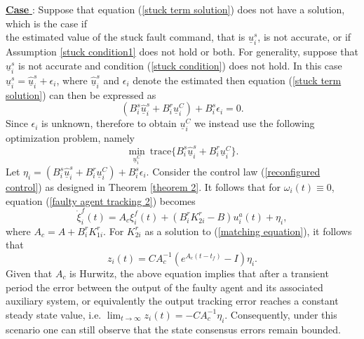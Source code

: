 \documentclass[12pt,draftcls,onecolumn]{IEEEtran}
\newcommand{\RNum}[1]{\uppercase\expandafter{\romannumeral #1\relax}}
\begin{document}
\underline{\textbf{Case \RNum{3}}}: Suppose that equation (\ref{stuck term solution}) does not have a solution, which is the case if \\
the estimated value of the stuck fault command, that is $\underline u_i^s$, is not accurate, or if Assumption  \ref{stuck condition1} does not hold or both. For generality, suppose that  $\underline u_i^s$ is not accurate and condition (\ref{stuck condition}) does not hold.  
In this case $\underline{u}_i^s=\underline{ \hat u}_i^s+\epsilon_i$, where $\underline{ \hat u}_i^s$ and $\epsilon_i$ denote the estimated then equation (\ref{stuck term solution}) can then be expressed as
$$ (B_i^s\underline{ \hat u}_i^s+B_i^r\underline u_i^C)+B_i^s\epsilon_i=0.$$
Since $\epsilon_i$ is unknown, therefore to obtain  $\underline u_i^C$  we instead use the following optimization problem, namely
\begin{equation*}
\min_{\underline u_i^C}\ \text{trace}\{B_i^s\underline{ \hat u}_i^s+B_i^r\underline u_i^C\}.
\end{equation*}
Let $\eta_i=(B_i^s\underline{ \hat u}_i^s+B_i^r\underline u_i^C)+B_i^s\epsilon_i$. 
Consider the control law (\ref{reconfigured control}) as designed in Theorem \ref{theorem 2}. It follows that for $\omega_i(t) \equiv 0$, equation (\ref{faulty agent tracking 2}) becomes 
\begin{equation*}
\dot{\xi}_i^f(t)=A_c\xi_i^f(t)+(B_i^rK_{2i}^r-B)u_i^a(t)+\eta_i,
\end{equation*}
where $A_c=A+B_i^rK_{1i}^r$. For $K_{2i}^r$ as a solution to (\ref{matching equation}), it follows that
\begin{equation*}
z_i(t)=C A_{c}^{-1}(e^{A_{c}(t-t_f)}-I)\eta_i.
\end{equation*}
Given that $A_{c}$ is Hurwitz, the above equation implies that after a transient period the error between the output of the faulty agent and its associated auxiliary system, or equivalently the output tracking error reaches a constant steady state value, i.e. $\lim_{t\to\infty} z_i(t)=-CA_c^{-1}\eta_i$. Consequently, under this scenario one can still observe that the state consensus errors remain bounded. \par
\end{document}
